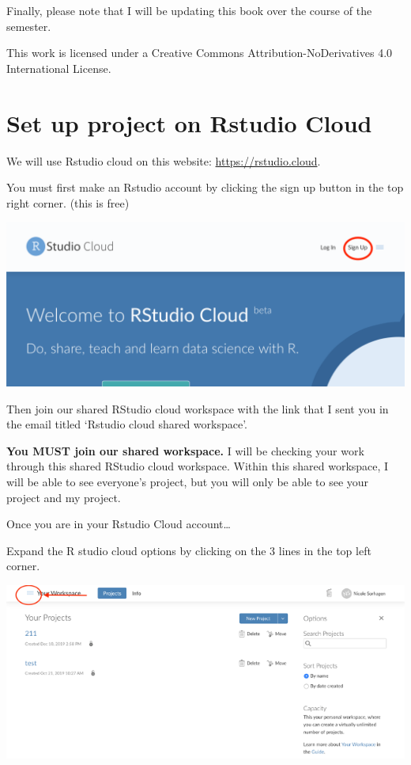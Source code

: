 \documentclass[
]{book}
\begin{document}
Finally, please note that I will be updating this book over the course of the semester.

This work is licensed under a Creative Commons Attribution-NoDerivatives 4.0 International License.

\hypertarget{set-up-project-on-rstudio-cloud}{%
\chapter{Set up project on Rstudio Cloud}\label{set-up-project-on-rstudio-cloud}}

We will use Rstudio cloud on this website: \url{https://rstudio.cloud}.

You must first make an Rstudio account by clicking the sign up button in the top right corner. (this is free)

\includegraphics{img/signup.png}

Then join our shared RStudio cloud workspace with the link that I sent you in the email titled `Rstudio cloud shared workspace'.

\textbf{You MUST join our shared workspace.} I will be checking your work through this shared RStudio cloud workspace. Within this shared workspace, I will be able to see everyone's project, but you will only be able to see your project and my project.

Once you are in your Rstudio Cloud account\ldots{}

Expand the R studio cloud options by clicking on the 3 lines in the top left corner.

\includegraphics{img/Picture1.png}
\end{document}
